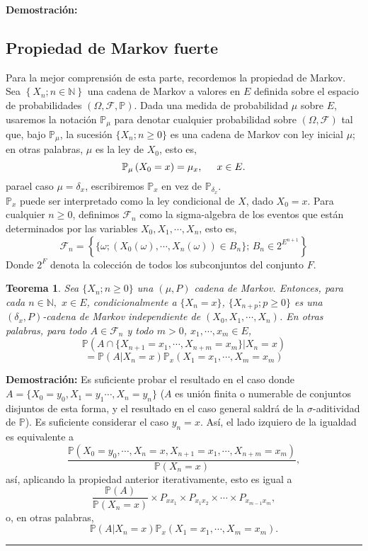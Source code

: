 \documentclass[a4paper]{article}
\newcommand{\prob}{\mathbb{P}}
\newtheorem{teorema}{Teorema}
\numberwithin{equation}{subsection}
\numberwithin{definicion}{subsection}
\def\N{\mathbb N}
\begin{document}
\textbf{Demostración: }\cite[págs. 20,21]{Pard}\\ \newline

\subsection{Propiedad de Markov fuerte}
Para la mejor comprensión de esta parte, recordemos la propiedad de Markov. Sea $\left\{X_n;n\in \N\right\}$ una cadena de Markov a valores en $E$ definida sobre el espacio de probabilidades $\left(\Omega,\mathcal{F},\prob\right)$. Dada una medida de probabilidad $\mu$ sobre $E$, usaremos la notación $\prob_{\mu}$ para denotar cualquier probabilidad sobre $\left(\Omega,\mathcal{F}\right)$ tal que, bajo $\prob_{\mu}$, la sucesión $\{X_n; n\geq 0\}$ es una cadena de Markov con ley inicial $\mu$; en otras palabras, $\mu$ es la ley de $X_0$, esto es,
\[\prob_{\mu}\left(X_0=x\right) = \mu_x, \hspace{0.5cm}x\in E.\]
parael caso $\mu = \delta_x$, escribiremos $\prob_x$ en vez de $\prob_{\delta_x}$.\\ $\prob_x$ puede ser interpretado como la ley condicional de $X$, dado $X_0=x$. Para cualquier $n\geq 0$, definimos $\mathcal{F}_n$ como la sigma-algebra de los eventos que están determinados por las variables $X_0,X_1,\cdots,X_n$, esto es,
\[\mathcal{F}_n = \left\{\{\omega; \left(X_0(\omega),\cdots,X_n(\omega)\right)\in B_n\};\,B_n \in 2^{E^{n+1}}\right\}\]
Donde $2^F$ denota la colección de todos los subconjuntos del conjunto $F$.

\begin{teorema}
Sea $\{X_n; n\geq 0\}$ una $(\mu,P)$ cadena de Markov. Entonces, para cada $n\in \N,$ $x\in E$, condicionalmente a $\{X_n=x\}$, $\{X_{n+p}; p\geq 0\}$ es una $(\delta_x,P)$-cadena de Markov independiente  de $\left(X_0,X_1,\cdots,X_n\right)$. En otras palabras, para todo $A \in \mathcal{F}_n$ y todo $m>0$, $x_1,\cdots,x_m \in E$,
\[\prob\left(A\cap\{X_{n+1}=x_1,\cdots,X_{n+m} = x_m\}|X_n=x\right)\]
\[= \prob\left(A|X_n=x\right)\prob_x\left(X_1 = x_1,\cdots,X_m = x_m\right)\]
\end{teorema}
\textbf{Demostración: }Es suficiente probar el resultado en el caso donde $A=\{X_0=y_0,X_1=y_1\cdots,X_n=y_n\}$ ($A$ es unión finita o numerable de conjuntos disjuntos de esta forma, y el resultado en el caso general saldrá de la $\sigma$-aditividad de $\prob$). Es suficiente considerar el caso $y_n =x$. Así, el lado izquiero de la igualdad es equivalente a
\[\frac{\prob\left(X_0=y_0,\cdots,X_n=x,X_{n+1}=x_1,\cdots,X_{n+m}=x_m\right)}{\prob\left(X_n=x\right)},\]
así, aplicando la propiedad anterior iterativamente, esto es igual a
\[\frac{\prob(A)}{\prob\left(X_n=x\right)}\times P_{xx_1}\times P_{x_1x_2}\times \cdots \times P_{x_{m-1}x_m},\]
o, en otras palabras,
\[\prob\left(A|X_n=x\right)\prob_x\left(X_1=x_1,\cdots,X_m=x_m\right).\]
\rule{0.7em}{0.7em}\\ \newline
\end{document}
